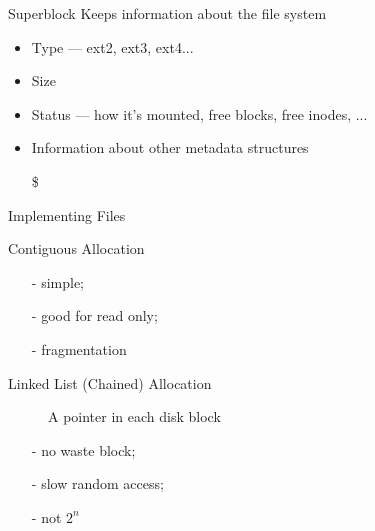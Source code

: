 \begin{frame}
  \begin{block}{Superblock}
    Keeps information about the file system
    \begin{itemize}
    \item Type --- ext2, ext3, ext4...
    \item Size
    \item Status --- how it's mounted, free blocks, free inodes, ...
    \item Information about other metadata structures
    \end{itemize}
  \end{block}
  \begin{itemize}
  \item[\$] 
  \end{itemize}
\end{frame}

\begin{frame}{Implementing Files}
  \begin{description}
  \item[Contiguous Allocation] 
  \end{description}
    \begin{center}
    \end{center}
  \begin{multicols}{2}
    \begin{itemize}
    \item[-] simple;
    \item[-] good for read only;
    \item[-] fragmentation
    \end{itemize}
  \end{multicols}
\end{frame}

\begin{frame}
  \begin{description}
  \item[Linked List (Chained) Allocation] A pointer in each disk block
  \end{description}
  \begin{center}
  \end{center}
  \begin{multicols}{3}
    \begin{itemize}
    \item[-] no waste block;
    \item[-] slow random access;
    \item[-] not $2^n$
    \end{itemize}
  \end{multicols}
\end{frame}


